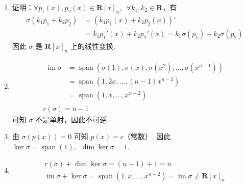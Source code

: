 \documentclass[12pt,fontset=fandol]{ctexart}
\begin{document}
\begin{solve}
\begin{enumerate}
                \item 证明：$ \forall p_1(x), p_2(x) \in \mathbf{R}[x]_n,\enspace \forall k_1, k_2 \in \mathbf{R} $，有
                      \begin{align*}
                          \sigma(k_1 p_1 + k_2 p_2) & = (k_1 p_1(x) + k_2 p_2(x))'                                    \\
                                                    & = k_1 p_1'(x) + k_2 p_2'(x) = k_1 \sigma(p_1) + k_2 \sigma(p_2)
                      \end{align*}
                      因此 $ \sigma $ 是 $ \mathbf{R}[x]_n $ 上的线性变换.

                \item \begin{gather*}
                          \begin{aligned}
                              \operatorname{im} \sigma & = \operatorname{span}(\sigma(1), \sigma(x), \sigma(x^2), \ldots, \sigma(x^{n - 1})) \\
                                         & = \operatorname{span}(1, 2x, \ldots, (n - 1) x^{n - 2})                             \\
                                         & = \operatorname{span}(1, x, \ldots, x^{n - 2})
                          \end{aligned} \\
                          r(\sigma) = n - 1
                      \end{gather*}
                      可知 $ \sigma $ 不是单射，因此不可逆.

                \item 由 $ \sigma(p(x)) = 0 $ 可知 $ p(x) = c $（常数）. 因此 $ \ker \sigma = \operatorname{span}(1),\enspace \dim \ker \sigma = 1 $.

                \item \begin{gather*}
                          r(\sigma) + \dim \ker \sigma = (n - 1) + 1 = n \\
                          \operatorname{im} \sigma + \ker \sigma = \operatorname{span}(1, x, \ldots, x^{n - 2}) = \operatorname{im} \sigma \neq \mathbf{R}[x]_n
                      \end{gather*}
            \end{enumerate}
\end{solve}
\end{document}
